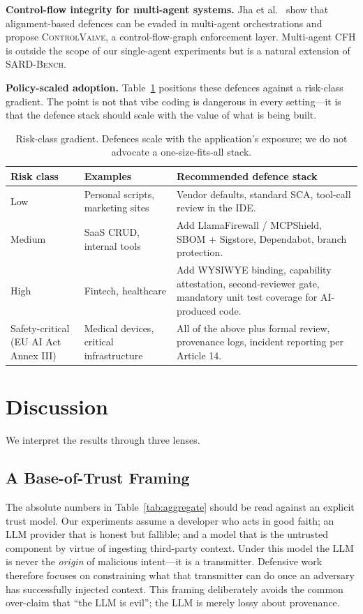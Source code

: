 \documentclass[twocolumn]{svjour3}
\begin{document}
\noindent\textbf{Control-flow integrity for multi-agent systems.}
Jha et al.~\cite{jha2026cfh} show that alignment-based defences can be evaded in multi-agent orchestrations and propose \textsc{ControlValve}, a control-flow-graph enforcement layer. Multi-agent CFH is outside the scope of our single-agent experiments but is a natural extension of \textsc{SARD-Bench}.

\noindent\textbf{Policy-scaled adoption.}
Table~\ref{tab:risk_class} positions these defences against a risk-class gradient. The point is not that vibe coding is dangerous in every setting---it is that the defence stack should scale with the value of what is being built.

\begin{table}[t]
\caption{Risk-class gradient. Defences scale with the application's exposure; we do not advocate a one-size-fits-all stack.}
\label{tab:risk_class}
\centering
\begin{tabular}{p{3.2cm} p{4.5cm} p{8.0cm}}
\toprule
\textbf{Risk class} & \textbf{Examples} & \textbf{Recommended defence stack} \\
\midrule
Low & Personal scripts, marketing sites & Vendor defaults, standard SCA, tool-call review in the IDE. \\
Medium & SaaS CRUD, internal tools & Add LlamaFirewall / MCPShield, SBOM + Sigstore, Dependabot, branch protection. \\
High & Fintech, healthcare & Add WYSIWYE binding, capability attestation, second-reviewer gate, mandatory unit test coverage for AI-produced code. \\
Safety-critical (EU AI Act Annex III) & Medical devices, critical infrastructure & All of the above plus formal review, provenance logs, incident reporting per Article 14. \\
\bottomrule
\end{tabular}
\end{table}

\section{Discussion}
\label{sec:discussion}

We interpret the results through three lenses.

\subsection{A Base-of-Trust Framing}
The absolute numbers in Table~\ref{tab:aggregate} should be read against an explicit trust model. Our experiments assume a developer who acts in good faith; an LLM provider that is honest but fallible; and a model that is the untrusted component by virtue of ingesting third-party context. Under this model the LLM is never the \emph{origin} of malicious intent---it is a transmitter. Defensive work therefore focuses on constraining what that transmitter can do once an adversary has successfully injected context. This framing deliberately avoids the common over-claim that ``the LLM is evil''; the LLM is merely lossy about provenance.
\end{document}
